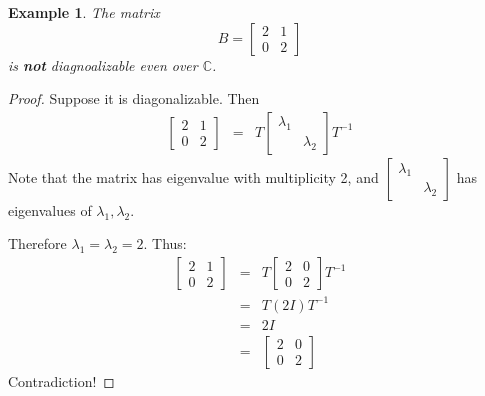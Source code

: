 \documentclass{article}
\theoremstyle{MyNonumberplain}
\theoremstyle{break}
\newtheorem*{proof}{Proof. }
\theoremstyle{break}
\newtheorem{example}{Example}[section]
\theoremstyle{break}
\theoremstyle{definition}
\theoremstyle{break}
\begin{document}
\begin{expbox}
    \begin{example}
        The matrix
        \[ B = \left[\begin{array}{cc}
             2 & 1\\
             0 & 2
           \end{array}\right] \]
        is \textbf{not} diagnoalizable even over $\mathbb{C}$.
    \end{example}
    \begin{prfbox}
        \begin{proof}
            Suppose it is diagonalizable. Then
            \begin{eqnarray*}
              \left[\begin{array}{cc}
                2 & 1\\
                0 & 2
              \end{array}\right] & = & T \left[\begin{array}{cc}
                \lambda_1 & \\
                & \lambda_2
              \end{array}\right] T^{- 1}
            \end{eqnarray*}
            Note that the matrix has eigenvalue with multiplicity 2, and
            $\left[\begin{array}{cc}
              \lambda_1 & \\
              & \lambda_2
            \end{array}\right]$ has eigenvalues of $\lambda_1, \lambda_2$.
            
            Therefore $\lambda_1 = \lambda_2 = 2$. Thus:
            \begin{eqnarray*}
              \left[\begin{array}{cc}
                2 & 1\\
                0 & 2
              \end{array}\right] & = & T \left[\begin{array}{cc}
                2 & 0\\
                0 & 2
              \end{array}\right] T^{- 1}\\
              & = & T (2 I) T^{- 1}\\
              & = & 2 I\\
              & = & \left[\begin{array}{cc}
                2 & 0\\
                0 & 2
              \end{array}\right]
            \end{eqnarray*}
            Contradiction!
        \end{proof}
    \end{prfbox}
\end{expbox}
\end{document}
